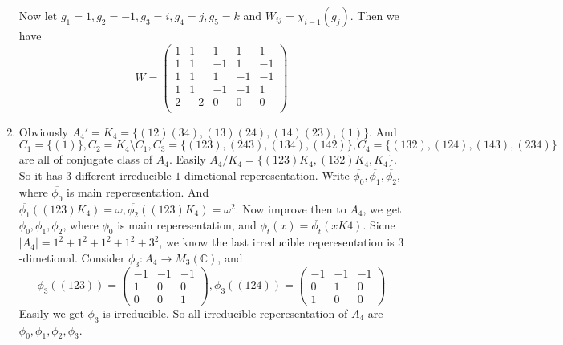 \documentclass{ctexart}
\begin{document}
\begin{solution}
\begin{enumerate}
          Now let \(g_1 = 1,g_2 = -1,g_3 = i,g_4 = j,g_5 = k\) and \(W_{ij}=\chi_{i-1}( g_j)\). Then we have
          \[
            W=\begin{pmatrix}
              1 & 1  & 1  & 1  & 1  \\
              1 & 1  & -1 & 1  & -1 \\
              1 & 1  & 1  & -1 & -1 \\
              1 & 1  & -1 & -1 & 1  \\
              2 & -2 & 0  & 0  & 0  \\
            \end{pmatrix}
          \]
    \item
          Obviously \(A_4'=K_4=\{(1 2)(3 4),(1 3)(2 4),(1 4)(2 3),(1)\}\).
          And \(C_1=\{(1)\}, C_2=K_4 \setminus C_1,C_3=\{(1 2 3),(243),(134),(142)\}, C_4=\{(132),(124),(143),(234)\}\) are all of conjugate class of \(A_4\).
          Easily \(A_4/K_4=\{(123)K_4,(132)K_4,K_4\}\). So it has \(3\) different irreducible \(1\)-dimetional reperesentation.
          Write \(\overline{\phi_0},\overline{\phi_1},\overline{\phi_2}\), where \(\overline{\phi_0}\) is main reperesentation.
          And \(\overline{\phi_1}((123)K_4)=\omega,\overline{\phi_2}((123)K_4)=\omega^2\).
          Now improve then to \(A_4\), we get \(\phi_0,\phi_1,\phi_2\), where \(\phi_0\) is main reperesentation, and
          \(\phi_t(x)=\overline{\phi_t}(xK4)\).
          Sicne \(|A_4|=1^2+1^2+1^2+1^2+3^2\), we know the last irreducible reperesentation is \(3\)-dimetional.
          Consider \(\phi_3:A_4 \to M_3(\mathbb{C})\), and
          \[
            \phi_3((123))=\begin{pmatrix}
              -1 & -1 & -1 \\
              1  & 0  & 0  \\
              0  & 0  & 1
            \end{pmatrix}, \phi_3((124))=\begin{pmatrix}
              -1 & -1 & -1 \\
              0  & 1  & 0  \\
              1  & 0  & 0
            \end{pmatrix}
          \]
          Easily we get \(\phi_3\) is irreducible. So all irreducible reperesentation of \(A_4\) are \(\phi_0,\phi_1,\phi_2,\phi_3\).


\end{enumerate}
\end{solution}
\end{document}

